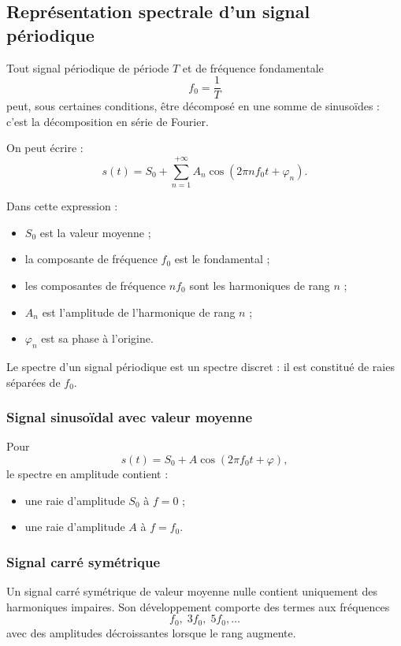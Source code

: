 \subsection{Représentation spectrale d'un signal périodique}

Tout signal périodique de période $T$ et de fréquence fondamentale
\[
f_0=\frac{1}{T}
\]
peut, sous certaines conditions, être décomposé en une somme de sinusoïdes : c'est la décomposition en série de Fourier.

On peut écrire :
\[
s(t)=S_0+\sum_{n=1}^{+\infty}A_n\cos\left(2\pi n f_0t+\varphi_n\right).
\]

Dans cette expression :
\begin{itemize}
  \item $S_0$ est la valeur moyenne ;
  \item la composante de fréquence $f_0$ est le fondamental ;
  \item les composantes de fréquence $nf_0$ sont les harmoniques de rang $n$ ;
  \item $A_n$ est l'amplitude de l'harmonique de rang $n$ ;
  \item $\varphi_n$ est sa phase à l'origine.
\end{itemize}

Le spectre d'un signal périodique est un spectre discret : il est constitué de raies séparées de $f_0$.

\subsubsection{Signal sinusoïdal avec valeur moyenne}

Pour
\[
s(t)=S_0+A\cos(2\pi f_0t+\varphi),
\]
le spectre en amplitude contient :
\begin{itemize}
  \item une raie d'amplitude $S_0$ à $f=0$ ;
  \item une raie d'amplitude $A$ à $f=f_0$.
\end{itemize}

\subsubsection{Signal carré symétrique}

Un signal carré symétrique de valeur moyenne nulle contient uniquement des harmoniques impaires. Son développement comporte des termes aux fréquences
\[
f_0,\;3f_0,\;5f_0,\ldots
\]
avec des amplitudes décroissantes lorsque le rang augmente.

